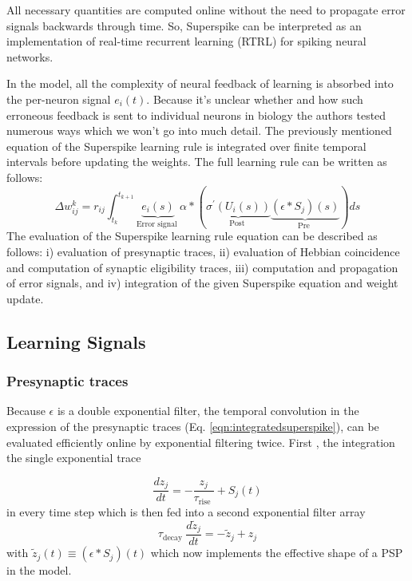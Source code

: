 \documentclass[12pt]{report}
\begin{document}
All necessary quantities are computed online without the need to propagate error signals backwards through time. So, Superspike can be interpreted as an implementation of real-time recurrent learning (RTRL) \cite{williams1989} for spiking neural networks. 

In the model, all the complexity of neural feedback of learning is absorbed into the per-neuron signal $e_{i}(t) .$ Because it's unclear whether and how such erroneous feedback is sent to individual neurons in biology the authors tested numerous ways which we won't go into much detail. The previously mentioned equation of the Superspike learning rule is integrated  over finite temporal intervals before updating the weights. The full learning rule can be written as follows:
\begin{equation}
\label{eqn:integratedsuperspike}
\Delta w_{i j}^{k}=r_{i j} \int_{t_{k}}^{t_{k+1}} \underbrace{e_{i}(s)}_{\text {Error signal }} \alpha *(\underbrace{\sigma^{\prime}\left(U_{i}(s)\right)}_{\text {Post }} \underbrace{\left(\epsilon * S_{j}\right)(s)}_{\text {Pre }}) d s
\end{equation}
The evaluation of the Superspike learning rule equation can be described as follows: i) evaluation of presynaptic traces, ii) evaluation of Hebbian coincidence and computation of synaptic eligibility traces, iii) computation and propagation of error signals, and iv) integration of the given Superspike equation and weight update. 
\subsection{Learning Signals}
\subsubsection{Presynaptic traces}
Because $\epsilon$ is a double exponential filter, the temporal convolution in the expression of the presynaptic traces (Eq. \ref{eqn:integratedsuperspike}), can be evaluated efficiently online by exponential filtering twice. First , the integration the single exponential trace

\begin{equation}
\frac{d z_{j}}{d t}=-\frac{z_{j}}{\tau_{\text {rise }}}+S_{j}(t)
\end{equation}
in every time step which is then fed into a second exponential filter array
\begin{equation}
\tau_{\text {decay }} \frac{d \tilde{z}_{j}}{d t}=-\tilde{z}_{j}+z_{j}
\end{equation}
with $\tilde{z}_{j}(t) \equiv\left(\epsilon * S_{j}\right)(t)$ which now implements the effective shape of a PSP in the model. 
\end{document}
